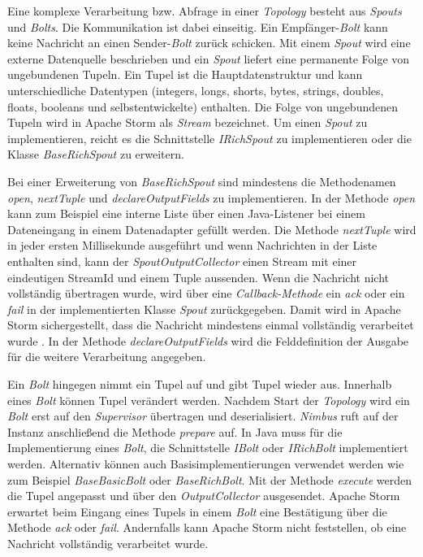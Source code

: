 Eine komplexe Verarbeitung bzw. Abfrage in einer \textit{Topology} besteht aus \textit{Spouts} und \textit{Bolts}. Die Kommunikation ist dabei einseitig. Ein Empfänger-\textit{Bolt} kann keine Nachricht an einen Sender-\textit{Bolt} zurück schicken. Mit einem \textit{Spout} wird eine externe Datenquelle beschrieben und ein \textit{Spout} liefert eine permanente Folge von ungebundenen Tupeln. Ein Tupel ist die Hauptdatenstruktur und kann unterschiedliche Datentypen (integers, longs, shorts, bytes, strings, doubles, floats, booleans und selbstentwickelte) enthalten. Die Folge von ungebundenen Tupeln wird in Apache Storm als \textit{Stream} bezeichnet. Um einen \textit{Spout} zu implementieren, reicht es die Schnittstelle \textit{IRichSpout} zu implementieren oder die Klasse \textit{BaseRichSpout} zu erweitern. 

Bei einer Erweiterung von \textit{BaseRichSpout} sind mindestens die Methodenamen \textit{open}, \textit{nextTuple} und \textit{declareOutputFields} zu implementieren. In der Methode \textit{open} kann zum Beispiel eine interne Liste über einen Java-Listener bei einem Dateneingang in einem Datenadapter gefüllt werden. Die Methode \textit{nextTuple} wird in jeder ersten Millisekunde ausgeführt und wenn Nachrichten in der Liste enthalten sind, kann der \textit{SpoutOutputCollector} einen Stream mit einer eindeutigen StreamId und einem Tuple aussenden. Wenn die Nachricht nicht vollständig übertragen wurde, wird über eine \textit{Callback-Methode} ein \textit{ack} oder ein \textit{fail} in der implementierten Klasse \textit{Spout} zurückgegeben. Damit wird in Apache Storm sichergestellt, dass die Nachricht mindestens einmal vollständig verarbeitet wurde . In der Methode \textit{declareOutputFields} wird die Felddefinition der Ausgabe für die weitere Verarbeitung angegeben. 

Ein \textit{Bolt} hingegen nimmt ein Tupel auf und gibt Tupel wieder aus. Innerhalb eines \textit{Bolt} können Tupel verändert werden. Nachdem Start der \textit{Topology} wird ein \textit{Bolt} erst auf den \textit{Supervisor} übertragen und deserialisiert. \textit{Nimbus} ruft auf der Instanz anschließend die Methode \textit{prepare} auf. In Java muss für die Implementierung eines \textit{Bolt}, die Schnittstelle \textit{IBolt} oder \textit{IRichBolt} implementiert werden. Alternativ können auch Basisimplementierungen verwendet werden wie zum Beispiel \textit{BaseBasicBolt} oder \textit{BaseRichBolt}. Mit der Methode \textit{execute} werden die Tupel angepasst und über den \textit{OutputCollector} ausgesendet. Apache Storm erwartet beim Eingang eines Tupels in einem \textit{Bolt} eine Bestätigung über die Methode \textit{ack} oder \textit{fail}. Andernfalls kann Apache Storm nicht feststellen, ob eine Nachricht vollständig verarbeitet wurde. 

